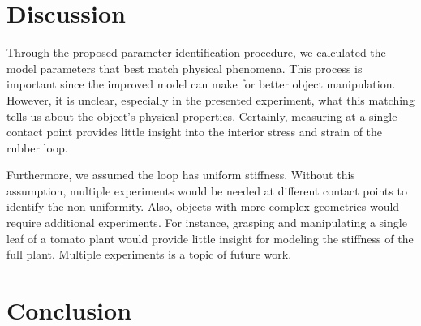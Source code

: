 \documentclass[letterpaper, 10pt, conference]{ieeeconf}
\begin{document}
\section{Discussion}
Through the proposed parameter identification procedure, we calculated the model parameters that best match physical phenomena.  This process is important since the improved model can make for better object manipulation.  However, it is unclear, especially in the presented experiment, what this matching tells us about the object's physical properties.  Certainly, measuring at a single contact point provides little insight into the interior stress and strain of the rubber loop.

Furthermore, we assumed the loop has uniform stiffness.  Without this assumption, multiple experiments would be needed at different contact points to identify the non-uniformity.  Also, objects with more complex geometries would require additional experiments.  For instance, grasping and manipulating a single leaf of a tomato plant would provide little insight for modeling the stiffness of the full plant.  Multiple experiments is a topic of future work.

\section{Conclusion}








\end{document}
